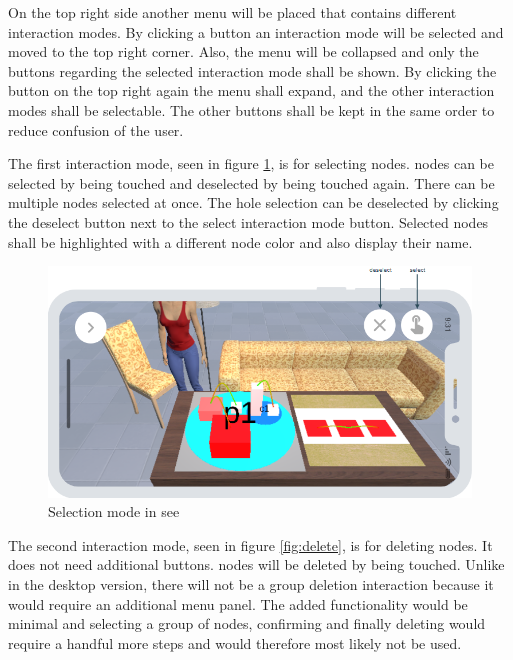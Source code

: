 On the top right side another menu will be placed that contains different interaction modes.
By clicking a button an interaction mode will be selected and moved to the top right corner.
Also, the menu will be collapsed and only the buttons regarding the selected interaction mode shall be shown.
By clicking the button on the top right again the menu shall expand, and the other interaction modes shall be selectable.
The other buttons shall be kept in the same order to reduce confusion of the user.

The first interaction mode, seen in figure \ref{fig:select}, is for selecting \glspl{node}.
\glspl{node} can be selected by being touched and deselected by being touched again.
There can be multiple \glspl{node} selected at once.
The hole selection can be deselected by clicking the deselect button next to the select interaction mode button.
Selected \glspl{node} shall be highlighted with a different \gls{node} color and also display their name.

\begin{figure}[htb]
    \centering
    \includegraphics[width=1\textwidth]{Concept/img/menu1.png}
    \caption{Selection mode in \gls{see}}\label{fig:select}
\end{figure}

The second interaction mode, seen in figure \ref{fig:delete}, is for deleting \glspl{node}.
It does not need additional buttons.
\glspl{node} will be deleted by being touched.
Unlike in the desktop version, there will not be a group deletion interaction because it would require an additional menu panel.
The added functionality would be minimal and selecting a group of \glspl{node}, confirming and finally deleting would require a handful more steps and would therefore most likely not be used.

